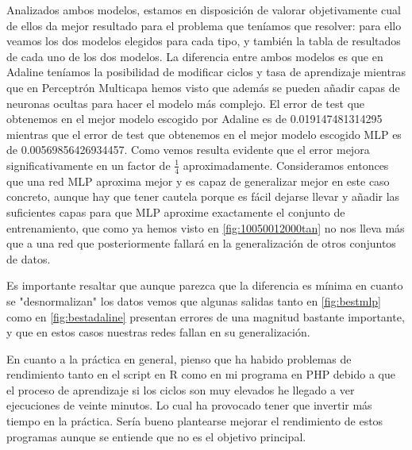 \documentclass[11pt,spanish,listoffigures,listoftables]{workluis}
\begin{document}
\par Analizados ambos modelos, estamos en disposición de valorar objetivamente cual de ellos da mejor resultado para el problema que teníamos que resolver: para ello veamos los dos modelos elegidos para cada tipo, y también la tabla de resultados de cada uno de los dos modelos. La diferencia entre ambos modelos es que en Adaline teníamos la posibilidad de modificar ciclos y tasa de aprendizaje mientras que en Perceptrón Multicapa hemos visto que además se pueden añadir capas de neuronas ocultas para hacer el modelo más complejo. El error de test que obtenemos en el mejor modelo escogido por Adaline es de 0.019147481314295 mientras que el error de test que obtenemos en el mejor modelo escogido MLP es de 0.00569856426934457. Como vemos resulta evidente que el error mejora significativamente en un factor de $\frac{1}{4}$ aproximadamente. Consideramos entonces que una red MLP aproxima mejor y es capaz de generalizar mejor en este caso concreto, aunque hay que tener cautela porque es fácil dejarse llevar y añadir las suficientes capas para que MLP aproxime exactamente el conjunto de entrenamiento, que como ya hemos visto en \ref{fig:10050012000tan} no nos lleva más que a una red que posteriormente fallará en la generalización de otros conjuntos de datos.

\par Es importante resaltar que aunque parezca que la diferencia es mínima en cuanto se "desnormalizan" los datos vemos que algunas salidas tanto en \ref{fig:bestmlp} como en \ref{fig:bestadaline} presentan errores de una magnitud bastante importante, y que en estos casos nuestras redes fallan en su generalización.

\par En cuanto a la práctica en general, pienso que ha habido problemas de rendimiento tanto en el script en R como en mi programa en PHP debido a que el proceso de aprendizaje si los ciclos son muy elevados he llegado a ver ejecuciones de veinte minutos. Lo cual ha provocado tener que invertir más tiempo en la práctica. Sería bueno plantearse mejorar el rendimiento de estos programas aunque se entiende que no es el objetivo principal.

\end{document}
